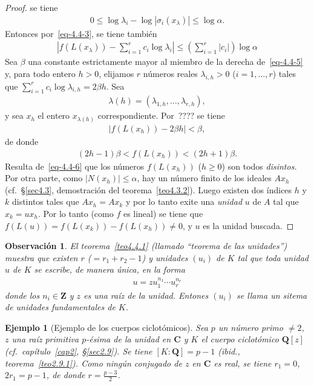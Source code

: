 \documentclass[10pt,oneside,bibtotoc,smallheadings,leqno,a5paper,DIV=12]{scrbook}
\newcommand{\QQ}{\mathbf{Q}}
\newcommand{\ZZ}{\mathbf{Z}}
\newcommand{\CC}{\mathbf{C}}
\newcommand{\QED}{}%
\newcommand{\abs}[1]{\left\lvert#1\right\rvert}
\numberwithin{equation}{section}
\theoremstyle{defi}
\theoremstyle{enonce}
\theoremstyle{rem}
\newtheorem*{example*}{Ejemplo}
\newtheorem*{remark*}{Observaci\'on}
\numberwithin{theorem}{section}
\numberwithin{proposition}{section}
\numberwithin{definition}{section}
\numberwithin{lemma}{section}
\numberwithin{corollary}{section}
\numberwithin{example}{section}
\numberwithin{footnote}{section}%
\begin{document}
\begin{proof}
se tiene
\begin{gather}
0\leq\log\lambda_{i}-\log\abs{\sigma_{i}(x_{\lambda})}\leq\log\alpha.
\end{gather}
Entonces por~\eqref{eq-4.4-3}, se tiene tambi\'en
\begin{gather}\label{eq-4.4-5}
\abs{f(L(x_{\lambda}))-\sum_{i=1}^{r}c_{i}\log\lambda_{i}}\leq\left(\sum_{i=1}^{r}\abs{c_{i}}\right)\log\alpha
\end{gather}
Sea $\beta$ una constante estrictamente mayor al miembro de la derecha de~\eqref{eq-4.4-5} y, para todo entero $h>0$,
elijamos $r$ n\'umeros reales $\lambda_{i,h}>0$ ($i=1,\dots,r$) tales que $\sum_{i=1}^{r}c_{i}\log\lambda_{i,h}
=2\beta h$. Sea
\begin{gather*}
\lambda(h)= (\lambda_{1,h},\dots,\lambda_{r,h}),
\end{gather*}
y sea $x_{h}$ el entero $x_{\lambda(h)}$ correspondiente. Por~???? se tiene
\begin{gather*}
\abs{f(L(x_{h}))-2\beta h} < \beta,
\end{gather*}
de donde
\begin{gather}\label{eq-4.4-6}
(2h-1)\beta < f(L(x_{h})) < (2h+1)\beta.
\end{gather}
Resulta de~\eqref{eq-4.4-6} que los n\'umeros $f(L(x_{h}))$ ($h\geq 0$) son todos {\em disintos.} Por otra parte,
como $\abs{N(x_{h})}\leq\alpha$, hay un n\'umero finito de los ideales $Ax_{h}$ (cf.~\S\ref{sec4.3}, demostraci\'on
del teorema~\ref{teo4.3.2}). Luego existen dos \'indices $h$ y $k$ distintos tales que $Ax_{h}=Ax_{k}$ y por lo tanto
exite una {\em unidad} $u$ de $A$ tal que $x_{k} = ux_{h}$. Por lo tanto (como $f$ es lineal) se tiene que
$f(L(u)) = f(L(x_{k})) - f(L(x_{h})) \neq 0$, y $u$ es la unidad buscada. \QED
\end{proof}

\begin{remark*}
El teorema~\ref{teo4.4.1} (llamado ``teorema de las unidades'') muestra que existen $r$ ($=r_{1}+r_{2}-1$) y unidades $(u_{i})$
de $K$ tal que toda unidad $u$ de $K$ se escribe, de manera \'unica, en la forma
\begin{gather}
u = zu_{1}^{n_{1}}\cdots u_{r}^{n_{r}}
\end{gather}
donde los $n_{i}\in\ZZ$ y $z$ es una ra\'iz de la unidad. Entones $(u_{i})$ se llama un {\em sitema de unidades
fundamentales} de $K$.
\end{remark*}

\begin{example*}[Ejemplo de los cuerpos ciclot\'omicos]
Sea $p$ un n\'umero primo $\neq 2$, $z$ una
ra\'iz primitiva $p$-\'esima de la unidad en $\CC$ y $K$ el cuerpo ciclot\'omico $\QQ[z]$
(cf.~cap\'itulo~\ref{cap2}, \S\ref{sec2.9}). Se tiene $[K:\QQ] = p-1$ ({\itshape ibid.}, teorema~\ref{teo2.9.1}). Como ning\'un conjugado de
$z$ en $\CC$ es real, se tiene $r_{1}=0$, $2r_{1} = p-1$, de donde $r = \frac{p-3}{2}$.
\end{example*}
\end{document}
